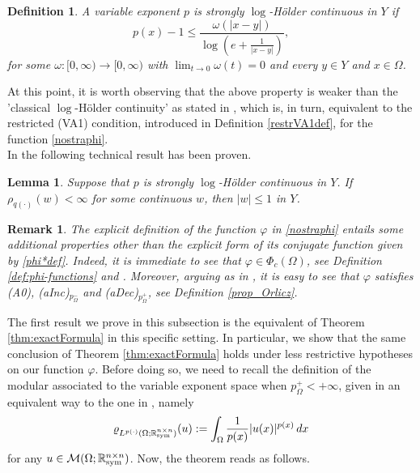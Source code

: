 \documentclass[a4paper,11pt,oneside,notitlepage]{article}
\newtheorem{lemma}[theorem]{Lemma}
\newtheorem{definition}[theorem]{Definition}
\newtheorem{remark}[theorem]{Remark}
\numberwithin{equation}{section}
\def\R{\mathbb{R}}
\def\M{\mathcal{M}}
\def\sym{{\rm sym}}
\newcommand{\vphi}{\varphi}
\newcommand{\vrho}{\varrho}
\begin{document}
\begin{definition}
\label{slHY}
    A variable exponent $p$ is \emph{strongly $\log$-H\"older continuous in $Y$} if
    \begin{equation*}
        p(x)-1 \le \frac{\omega(|x-y|)}{\log(e+ \frac{1}{|x - y|})},
    \end{equation*}
    for some $\omega:[0,\infty)\to [0, \infty)$ with $\lim_{t \to 0}\omega(t)=0$ and every $y \in Y$ and $x\in\Omega$.
\end{definition}

At this point, it is worth observing that the above property is weaker than the 'classical $\log$-H\"older continuity' as stated in \cite[Definition 2.3]{BHHZ}, which is, in turn, equivalent to the restricted (VA1) condition, introduced in Definition \ref{restrVA1def}, for the function \eqref{nostraphi}. 
\\
In \cite{BHHZ} the following technical result has been proven.

\begin{lemma}
\label{lem:smallOnY}
    Suppose that $p$ is strongly $\log$-Hölder continuous in $Y$. If $\rho_{q(\cdot)}(w)<\infty$ for some continuous $w$, then $|w|\le 1$ in $Y$.
\end{lemma}

\begin{remark}
\label{rmk:prop_variable_exp}
    The explicit definition of the function $\vphi$ in \eqref{nostraphi} entails some additional properties other than the explicit form of its conjugate function given by \eqref{phi*def}. Indeed, it is immediate to see that $\vphi \in \Phi_c(\Omega)$, see Definition \ref{def:phi-functions} and \cite[Section 7.1]{HaH}. Moreover, arguing as in \cite[Lemma 7.1.1]{HaH}, it is easy to see that $\vphi$ satisfies (A0), (aInc)$_{p^-_\Omega}$ and (aDec)$_{p^+_\Omega}$, see Definition \ref{prop_Orlicz}.
\end{remark}

The first result we prove in this subsection is the equivalent of Theorem \ref{thm:exactFormula} in this specific setting. In particular, we show that the same conclusion of Theorem \ref{thm:exactFormula} holds under less restrictive hypotheses on our function $\vphi$. Before doing so, we need to recall the definition of the modular associated to the variable exponent space when $p^+_\Omega < +\infty$, given in an equivalent way to the one in \cite[Subsection 2.2]{HHL}, namely
\begin{equation*}
    \vrho_{L^{p(\cdot)}(\Omega; \R^{n \times n}_\sym)}(u) := \int_{\Omega} \frac{1}{p(x)} |u(x)|^{p(x)} \, dx
\end{equation*}
for any $u \in \M(\Omega; \R^{n \times n}_\sym)$. Now, the theorem reads as follows.
\end{document}
